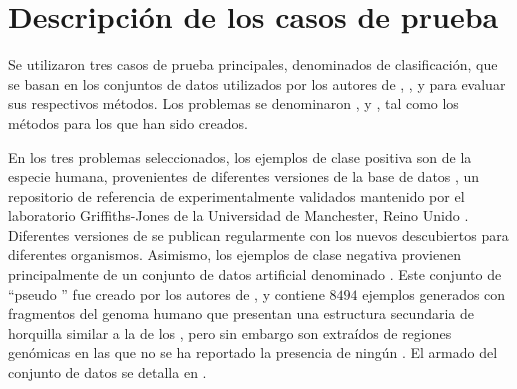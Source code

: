 %
%
%
\section{Descripción de los casos de prueba}
%
Se utilizaron tres casos de prueba principales, denominados
 de clasificación, que se basan en los conjuntos de
datos utilizados por los autores de \work{\tripletsvm} \cite{xue},
\work{\mipred} \cite{ng}, y \work{\micropred} \cite{batuwita} para
evaluar sus respectivos métodos.
Los problemas se denominaron \prob\tripletsvm{}, \prob{\mipred} y
\prob\micropred{}, tal como los métodos para los que han sido
creados.

En los tres problemas seleccionados, los ejemplos de clase positiva
son  de la especie humana, provenientes de diferentes
versiones de la base de datos \work{\mirbase}, un repositorio de
referencia de  experimentalmente validados mantenido por
el laboratorio Griffiths-Jones de la Universidad de Manchester, Reino
Unido \cite{mirbase1, mirbase2, mirbase3}.
Diferentes versiones de \work\mirbase{} se publican regularmente con
los nuevos  descubiertos para diferentes organismos.
Asimismo, los ejemplos de clase negativa provienen principalmente de
un conjunto de datos artificial denominado .
Este conjunto de ``pseudo '' fue creado por los autores de
\work{\tripletsvm}, y contiene $8494$ ejemplos generados con fragmentos
del genoma humano que presentan una estructura secundaria de horquilla
similar a la de los , pero sin embargo son extraídos de
regiones genómicas en las que no se ha reportado la presencia de
ningún \premirna{}.
El armado del conjunto de datos  se detalla en \cite{xue}.
